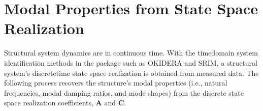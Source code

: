 \documentclass[letterpaper,10pt,english]{sphinxmanual}
\begin{document}
\section{Modal Properties from State Space Realization}
\label{\detokenize{theory/modes:modal-properties-from-state-space-realization}}\label{\detokenize{theory/modes::doc}}
\sphinxAtStartPar
Structural system dynamics are in continuous time. With the time\sphinxhyphen{}domain
system identification methods in the  package such as OKID\sphinxhyphen{}ERA
and SRIM, a structural system’s discrete\sphinxhyphen{}time state space realization is
obtained from measured data. The following process recovers the
structure’s modal properties (i.e., natural frequencies, modal damping
ratios, and mode shapes) from the discrete state space realization
coefficients, \(\mathbf{A}\) and \(\mathbf{C}\).
\end{document}
